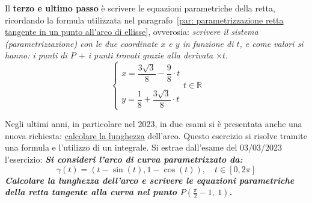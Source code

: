 \documentclass[a4paper]{article}
\begin{document}
	\noindent
	Il \textbf{terzo e ultimo passo} è scrivere le equazioni parametriche della retta, ricordando la formula utilizzata nel paragrafo~\ref{par: parametrizzazione retta tangente in un punto all'arco di ellisse}, ovverosia: \emph{scrivere il sistema (parametrizzazione) con le due coordinate $x$ e $y$ in funzione di $t$, e come valori si hanno: i punti di $P$ $+$ i punti trovati grazie alla derivata $\times t$}.
	\begin{equation*}
		\begin{cases}
			x = \dfrac{3\sqrt{3}}{8} -\dfrac{9}{8} \cdot t \\
			\\
			y = \dfrac{1}{8} +\dfrac{3\sqrt{3}}{8} \cdot t
		\end{cases} t \in \mathbb{R}
	\end{equation*}\newpage

	\noindent
	Negli ultimi anni, in particolare nel 2023, in due esami si è presentata anche una nuova richiesta: \underline{calcolare la lunghezza} dell'arco. Questo esercizio si risolve tramite una formula e l'utilizzo di un integrale. Si estrae dall'esame del 03/03/2023 l'esercizio: \textcolor{Green4}{\textbf{\emph{Si consideri l'arco di curva parametrizzato da:}}
	\begin{equation*}
		\gamma\left(t\right) = \left(t - \sin\left(t\right), 1 - \cos\left(t\right)\right), \hspace{1em} t \in \left[0,2\pi\right]
	\end{equation*}
	\textbf{\emph{Calcolare la lunghezza dell'arco e scrivere le equazioni parametriche della retta tangente alla curva nel punto $P\left(\frac{\pi}{2} -1, \: 1\right)$.}}}\newline
\end{document}
